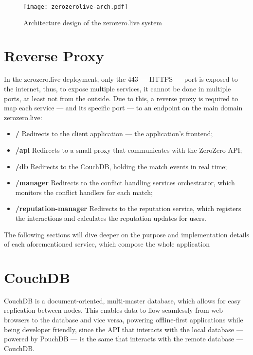 \begin{figure}[t]
    \begin{center}
        \leavevmode
        \texttt{[image: zerozerolive-arch.pdf]}
        \caption{Architecture design of the zerozero.live system}
        \label{fig:services-arch}
    \end{center}
\end{figure}

\section{Reverse Proxy}

In the zerozero.live deployment, only the 443 --- HTTPS --- port is exposed to the internet, thus, to expose multiple services, it cannot be done in multiple ports, at least not from the outside. Due to this, a reverse proxy is required to map each service --- and its specific port --- to an endpoint on the main domain zerozero.live:
 
\begin{itemize}
    \item \textbf{/} Redirects to the client application --- the application's frontend;
    \item \textbf{/api} Redirects to a small proxy that communicates with the ZeroZero API;
    \item \textbf{/db} Redirects to the CouchDB, holding the match events in real time;
    \item \textbf{/manager} Redirects to the conflict handling services orchestrator, which monitors the conflict handlers for each match;
    \item \textbf{/reputation-manager} Redirects to the reputation service, which registers the interactions and calculates the reputation updates for users.
\end{itemize}

The following sections will dive deeper on the purpose and implementation details of each aforementioned service, which compose the whole application 

\section{CouchDB}

CouchDB is a document-oriented, multi-master database, which allows for easy replication between nodes. This enables data to flow seamlessly from web browsers to the database and vice versa, powering offline-first applications while being developer friendly, since the API that interacts with the local database --- powered by PouchDB --- is the same that interacts with the remote database --- CouchDB.


